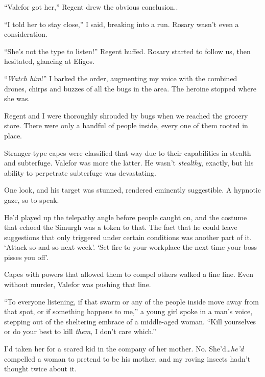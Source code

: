 ``Valefor got her,'' Regent drew the obvious conclusion..



``I told her to stay close,'' I said, breaking into a run.  Rosary wasn't even a consideration.



``She's not the type to listen!''  Regent huffed.  Rosary started to follow us, then hesitated, glancing at Eligos.



``\emph{Watch him}!'' I barked the order, augmenting my voice with the combined drones, chirps and buzzes of all the bugs in the area.  The heroine stopped where she was.



Regent and I were thoroughly shrouded by bugs when we reached the grocery store.  There were only a handful of people inside, every one of them rooted in place.



Stranger-type capes were classified that way due to their capabilities in stealth and subterfuge.  Valefor was more the latter.  He wasn't \emph{stealthy}, exactly, but his ability to perpetrate subterfuge was devastating.



One look, and his target was stunned, rendered eminently suggestible.  A hypnotic gaze, so to speak.



He'd played up the telepathy angle before people caught on, and the costume that echoed the Simurgh was a token to that.  The fact that he could leave suggestions that only triggered under certain conditions was another part of it.  `Attack so-and-so next week'.  `Set fire to your workplace the next time your boss pisses you off'.



Capes with powers that allowed them to compel others walked a fine line.  Even without murder, Valefor was pushing that line.



``To everyone listening, if that swarm or any of the people inside move away from that spot, or if something happens to me,'' a young girl spoke in a man's voice, stepping out of the sheltering embrace of a middle-aged woman. ``Kill yourselves or do your best to kill \emph{them, }I don't care which.''



I'd taken her for a scared kid in the company of her mother.  No.  She'd\ldots \emph{he'd} compelled a woman to pretend to be his mother, and my roving insects hadn't thought twice about it.



